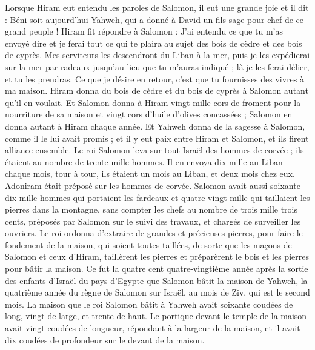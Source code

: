 \begin{multicols}{2}
Lorsque Hiram eut entendu les paroles de Salomon, il eut une grande joie et il dit : Béni soit aujourd'hui Yahweh, qui a donné à David un fils sage pour chef de ce grand peuple !
Hiram fit répondre à Salomon : J'ai entendu ce que tu m'as envoyé dire et je ferai tout ce qui te plaira au sujet des bois de cèdre et des bois de cyprès.
Mes serviteurs les descendront du Liban à la mer, puis je les expédierai sur la mer par radeaux jusqu'au lieu que tu m'auras indiqué ; là je les ferai délier, et tu les prendras. Ce que je désire en retour, c’est que tu fournisses des vivres à ma maison.
Hiram donna du bois de cèdre et du bois de cyprès à Salomon autant qu'il en voulait.
Et Salomon donna à Hiram vingt mille cors de froment pour la nourriture de sa maison et vingt cors d'huile d’olives concassées ; Salomon en donna autant à Hiram chaque année.
Et Yahweh donna de la sagesse à Salomon, comme il le lui avait promis ; et il y eut paix entre Hiram et Salomon, et ils firent alliance ensemble.
Le roi Salomon leva sur tout Israël des hommes de corvée ; ils étaient au nombre de trente mille hommes.
Il en envoya dix mille au Liban chaque mois, tour à tour, ils étaient un mois au Liban, et deux mois chez eux. Adoniram était préposé sur les hommes de corvée.
Salomon avait aussi soixante-dix mille hommes qui portaient les fardeaux et quatre-vingt mille qui taillaient les pierres dans la montagne,
sans compter les chefs au nombre de trois mille trois cents, préposés par Salomon sur le suivi des travaux, et chargés de surveiller les ouvriers.
Le roi ordonna d’extraire de grandes et précieuses pierres, pour faire le fondement de la maison, qui soient toutes taillées,
de sorte que les maçons de Salomon et ceux d'Hiram, taillèrent les pierres et préparèrent le bois et les pierres pour bâtir la maison.
\VerseOne{}Ce fut la quatre cent quatre-vingtième année après la sortie des enfants d'Israël du pays d'Egypte que Salomon bâtit la maison de Yahweh, la quatrième année du règne de Salomon sur Israël, au mois de Ziv, qui est le second mois.
La maison que le roi Salomon bâtit à Yahweh avait soixante coudées de long, vingt de large, et trente de haut.
Le portique devant le temple de la maison avait vingt coudées de longueur, répondant à la largeur de la maison, et il avait dix coudées de profondeur sur le devant de la maison.

\end{multicols}
